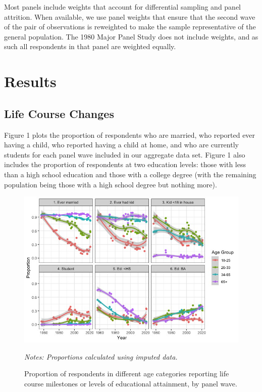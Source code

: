 \documentclass[
  12pt,
]{article}
\begin{document}
Most panels include weights that account for differential sampling and panel attrition. When available, we use panel weights that ensure that the second wave of the pair of observations is reweighted to make the sample representative of the general population. The 1980 Major Panel Study does not include weights, and as such all respondents in that panel are weighted equally.

\hypertarget{results}{%
\section{Results}\label{results}}

\hypertarget{life-course-changes}{%
\subsection{Life Course Changes}\label{life-course-changes}}

Figure 1 plots the proportion of respondents who are married, who reported ever having a child, who reported having a child at home, and who are currently students for each panel wave included in our aggregate data set. Figure 1 also includes the proportion of respondents at two education levels: those with less than a high school education and those with a college degree (with the remaining population being those with a high school degree but nothing more).

\begin{figure}[]
\begin{center}
\caption{Proportion of respondents in different age categories reporting life course milestones or levels of educational attainment, by panel wave.}

\includegraphics[width=1\linewidth]{../figures/demo_variables}

\end{center}
\footnotesize{\textit{Notes: Proportions calculated using imputed data.} }
\end{figure}
\end{document}
